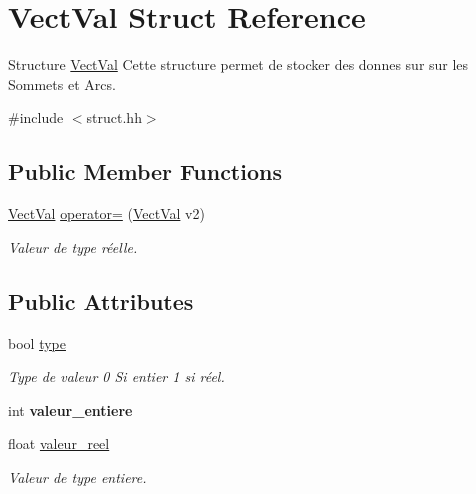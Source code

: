 \hypertarget{structVectVal}{}\section{Vect\+Val Struct Reference}
\label{structVectVal}


Structure \hyperlink{structVectVal}{Vect\+Val} Cette structure permet de stocker des donnes sur sur les Sommets et Arcs.  




{\ttfamily \#include $<$struct.\+hh$>$}

\subsection*{Public Member Functions}
\begin{DoxyCompactItemize}
\item 
\hyperlink{structVectVal}{Vect\+Val} \hyperlink{structVectVal_a93625cc50fedf5f624ad56f791fd9124}{operator=} (\hyperlink{structVectVal}{Vect\+Val} v2)
\begin{DoxyCompactList}\small\item\em Valeur de type r\'{e}elle. \end{DoxyCompactList}\end{DoxyCompactItemize}
\subsection*{Public Attributes}
\begin{DoxyCompactItemize}
\item 
\mbox{\label{structVectVal_aa7874b7517b8a6130ad6a836c2216be1}} 
bool \hyperlink{structVectVal_aa7874b7517b8a6130ad6a836c2216be1}{type}
\begin{DoxyCompactList}\small\item\em Type de valeur 0 Si entier 1 si réel. \end{DoxyCompactList}\item 
\mbox{\label{structVectVal_a309e1bed17bd6b88f91fdea80b9a0186}} 
int {\bfseries valeur\+\_\+entiere}
\item 
\mbox{\label{structVectVal_a717e468f148d275885983834f88fd696}} 
float \hyperlink{structVectVal_a717e468f148d275885983834f88fd696}{valeur\+\_\+reel}
\begin{DoxyCompactList}\small\item\em Valeur de type entiere. \end{DoxyCompactList}\end{DoxyCompactItemize}



